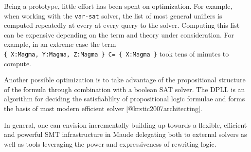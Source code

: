 \documentclass[]{article}
\begin{document}
Being a prototype, little effort has been spent on optimization. For
example, when working with the \texttt{var-sat} solver, the list of most
general unifiers is computed repeatedly at every at every query to the
solver. Computing this list can be expensive depending on the term and
theory under consideration. For example, in an extreme case the term
\texttt{\{\ X:Magma,\ Y:Magma,\ Z:Magma\ \}\ C=\ \{\ X:Magma\ \}} took
tens of minutes to compute.

Another possible optimization is to take advantage of the propositional
structure of the formula through combination with a boolean SAT solver.
The DPLL is an algorithm for deciding the satisfiablilty of
propositional logic formulae and forms the basis of most modern
efficient solver {[}@krstic2007architecting{]}.

In general, one can envision incrementally building up towards a
flexible, efficient and powerful SMT infrastructure in Maude delegating
both to external solvers as well as tools leveraging the power and
expressiveness of rewriting logic.
\end{document}
